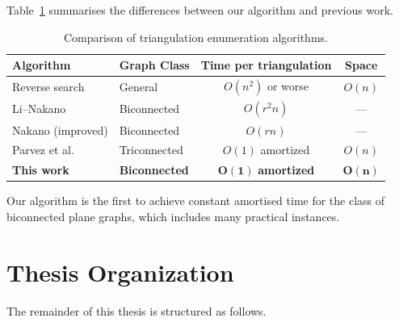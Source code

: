 Table~\ref{tab:comparison} summarises the differences between our algorithm and previous work.

\begin{table}[htbp]
    \centering
    \caption{Comparison of triangulation enumeration algorithms.}
    \label{tab:comparison}
    \begin{tabular}{|l|l|c|c|}
        \hline
        \textbf{Algorithm} & \textbf{Graph Class} & \textbf{Time per triangulation} & \textbf{Space} \\
        \hline
        Reverse search~\cite{avis1996} & General & \(O(n^2)\) or worse & \(O(n)\) \\
        Li–Nakano~\cite{li2001} & Biconnected & \(O(r^2 n)\) & --- \\
        Nakano (improved) & Biconnected & \(O(r n)\) & --- \\
        Parvez et al.~\cite{parvez2011} & Triconnected & \(O(1)\) amortized & \(O(n)\) \\
        \textbf{This work} & \textbf{Biconnected} & \(\mathbf{O(1)}\) \textbf{amortized} & \(\mathbf{O(n)}\) \\
        \hline
    \end{tabular}
\end{table}

Our algorithm is the first to achieve constant amortised time for the class of biconnected plane graphs, which includes many practical instances.

\section{Thesis Organization}
\label{sec:organization}

The remainder of this thesis is structured as follows.

